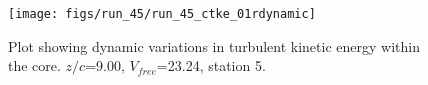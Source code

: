 \begin{figure}[H]
\centering
\texttt{[image: figs/run\_45/run\_45\_ctke\_01rdynamic]}
\caption{Plot showing dynamic variations in turbulent kinetic energy within the core. $z/c$=9.00, $V_{free}$=23.24, station 5.}
\label{fig:run_45_ctke_01rdynamic}
\end{figure}


